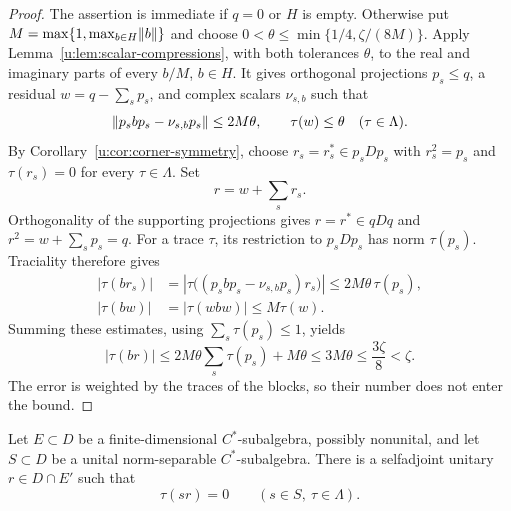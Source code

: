 \begin{proof}
The assertion is immediate if $q=0$ or $H$ is empty.  Otherwise put
$M=\max\{1,\max_{b\in H}\lVert b\rVert\}$ and choose
$0<\theta\le\min\{1/4,\zeta/(8M)\}$.  Apply
Lemma~\ref{u:lem:scalar-compressions}, with both tolerances $\theta$,
to the real and imaginary parts of every $b/M$, $b\in H$.
It gives orthogonal projections $p_s\le q$, a residual
$w=q-\sum_s p_s$, and complex scalars $\nu_{s,b}$ such that
\[
 \lVert p_sbp_s-\nu_{s,b}p_s\rVert\le2M\theta,
 \qquad \tau(w)\le\theta\quad(\tau\in\Lambda).
\]
By Corollary~\ref{u:cor:corner-symmetry}, choose
$r_s=r_s^*\in p_sDp_s$ with $r_s^2=p_s$ and
$\tau(r_s)=0$ for every $\tau\in\Lambda$.  Set
\[
 r=w+\sum_s r_s.
\]
Orthogonality of the supporting projections gives $r=r^*\in qDq$ and
$r^2=w+\sum_s p_s=q$.  For a trace $\tau$, its restriction to
$p_sDp_s$ has norm $\tau(p_s)$.  Traciality therefore gives
\[
 \begin{split}
 |\tau(br_s)|
 &=\left|\tau\bigl((p_sbp_s-\nu_{s,b}p_s)r_s\bigr)\right|
 \le2M\theta\,\tau(p_s),\\
 |\tau(bw)|&=|\tau(wbw)|\le M\tau(w).
 \end{split}
\]
Summing these estimates, using $\sum_s\tau(p_s)\le1$, yields
\[
 |\tau(br)|\le2M\theta\sum_s\tau(p_s)+M\theta
             \le3M\theta\le\frac{3\zeta}{8}<\zeta.
\]
The error is weighted by the traces of the blocks, so their number
does not enter the bound.
\end{proof}

\begin{proposition}
\label{u:prop:centered-symmetry}
Let $E\subset D$ be a finite-dimensional $C^*$-subalgebra, possibly
nonunital, and let $S\subset D$ be a unital norm-separable
$C^*$-subalgebra.  There is a selfadjoint unitary $r\in D\cap E'$ such
that
\begin{equation}
\label{u:eq:centered-symmetry}
 \tau(sr)=0\qquad(s\in S,\ \tau\in\Lambda).
\end{equation}
\end{proposition}

